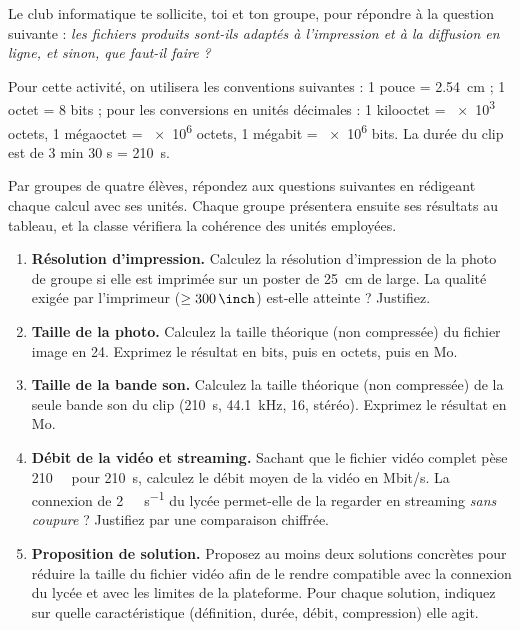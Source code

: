 \documentclass[11pt]{article}
\newcounter{popsec}
\newcounter{popsub}
\newcommand{\courssub}[1]{%
  \stepcounter{popsub}%
  \par\vspace{9pt}\noindent{\popxbold\fontsize{11.5}{13}\selectfont\color{popink}{\color{poporange}\thepopsec.\thepopsub}\hspace{6pt}#1}\par\nopagebreak\vspace{4pt}
}
\begin{document}
Le club informatique te sollicite, toi et ton groupe, pour répondre à la question suivante : \emph{les fichiers produits sont-ils adaptés à l'impression et à la diffusion en ligne, et sinon, que faut-il faire ?}

\begin{attention}
Pour cette activité, on utilisera les conventions suivantes : 1 pouce = \SI{2,54}{\centi\meter} ; 1 octet = 8 bits ; pour les conversions en unités décimales : 1 kilooctet = \num{e3} octets, 1 mégaoctet = \num{e6} octets, 1 mégabit = \num{e6} bits. La durée du clip est de 3 min 30 s = \SI{210}{\second}.
\end{attention}

\courssub{Consignes}

Par groupes de quatre élèves, répondez aux questions suivantes en rédigeant chaque calcul avec ses unités. Chaque groupe présentera ensuite ses résultats au tableau, et la classe vérifiera la cohérence des unités employées.

\begin{enumerate}
\item \textbf{Résolution d'impression.} Calculez la résolution d'impression de la photo de groupe si elle est imprimée sur un poster de \SI{25}{\centi\meter} de large. La qualité exigée par l'imprimeur ($\geq \SI{300}{\per\inch}$) est-elle atteinte ? Justifiez.
\item \textbf{Taille de la photo.} Calculez la taille théorique (non compressée) du fichier image en \SI{24}{\bit}. Exprimez le résultat en bits, puis en octets, puis en Mo.
\item \textbf{Taille de la bande son.} Calculez la taille théorique (non compressée) de la seule bande son du clip (\SI{210}{\second}, \SI{44,1}{\kilo\hertz}, \SI{16}{\bit}, stéréo). Exprimez le résultat en Mo.
\item \textbf{Débit de la vidéo et streaming.} Sachant que le fichier vidéo complet pèse \SI{210}{\mega\byte} pour \SI{210}{\second}, calculez le débit moyen de la vidéo en Mbit/s. La connexion de \SI{2}{\mega\bit\per\second} du lycée permet-elle de la regarder en streaming \emph{sans coupure} ? Justifiez par une comparaison chiffrée.
\item \textbf{Proposition de solution.} Proposez au moins deux solutions concrètes pour réduire la taille du fichier vidéo afin de le rendre compatible avec la connexion du lycée et avec les limites de la plateforme. Pour chaque solution, indiquez sur quelle caractéristique (définition, durée, débit, compression) elle agit.
\end{enumerate}
\end{document}
